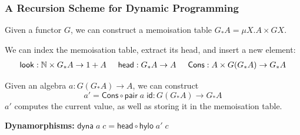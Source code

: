 \begin{frame}
  \frametitle{A Recursion Scheme for Dynamic Programming}
  Given a functor $G$, we can construct a
  memoisation table $G_{\ast} A = \mu X. A \times G X$.

  We can index the memoisation table, extract its head, and insert a new element:
  \[
    \begin{array}{@{}l@{}}
      \mathsf{look} : \mathbb{N} \times G_{{\ast}}A \to 1 + A \hspace{.5cm}
      \mathsf{head} : G_{\ast} A \to A \hspace{.5cm}
      \mathsf{Cons} : A \times G (G_{\ast} A) \to G_{\ast} A
    \end{array}
  \]

  \vspace{.2cm}
  Given an algebra $a : G(G_{\ast}A)\to A$, we can construct
  \[ a'= \mathsf{Cons} \circ \mathsf{pair}\; a\; \mathsf{id} : G(G_{\ast} A) \to G_{\ast} A
  \]
  $a'$ computes the current value, as well as storing it
  in the memoisation table.
  \vspace{.3cm}

    \begin{overprint}
    \begin{center}
    \begin{minipage}{.7\columnwidth}
    \begin{greenbox}
      \textbf{Dynamorphisms:} \hspace{.3cm}
      $\mathsf{dyna}\; a\;c = \mathsf{head}\circ \mathsf{hylo}\;a'\;c$
    \end{greenbox}
    \end{minipage}
    \end{center}
    \end{overprint}

\end{frame}

